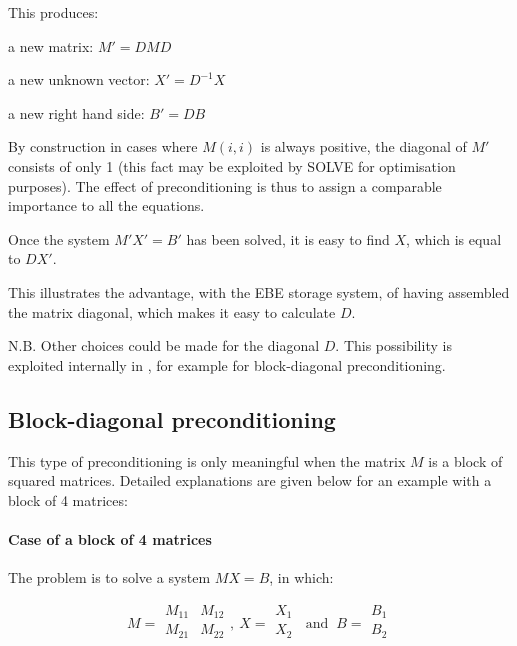 This produces:

a new matrix: $M' = DMD$

a new unknown vector: $X' = D^{-1}X$

a new right hand side: $B' = DB$

By construction in cases where $M(i,i)$ is always positive, the diagonal of $M'$
consists of only 1 (this fact may be exploited by SOLVE for optimisation
purposes). The effect of preconditioning is thus to assign a comparable
importance to all the equations.

Once the system $M'X' = B'$ has been solved, it is easy to find $X$, which is
equal to $DX'$.

This illustrates the advantage, with the EBE storage system, of having
assembled the matrix diagonal, which makes it easy to calculate $D$.

N.B. Other choices could be made for the diagonal $D$. This possibility is
exploited internally in \bief, for example for block-diagonal preconditioning.

\subsection{Block-diagonal preconditioning}

This type of preconditioning is only meaningful when the matrix $M$ is a block
of squared matrices. Detailed explanations are given below for an example with a
block of 4 matrices:


\paragraph{Case of a block of 4 matrices}

The problem is to solve a system $MX=B$, in which:

\[M =
\begin{array}{|cc|}
  M_{11} & M_{12} \\
  M_{21} & M_{22} \\
\end{array}
,~X =
\begin{array}{|c|}
  X_{1} \\
  X_{2} \\
\end{array}
~\textrm{ and }~ B =
\begin{array}{|c|}
  B_{1} \\
  B_{2} \\
\end{array}
\]

